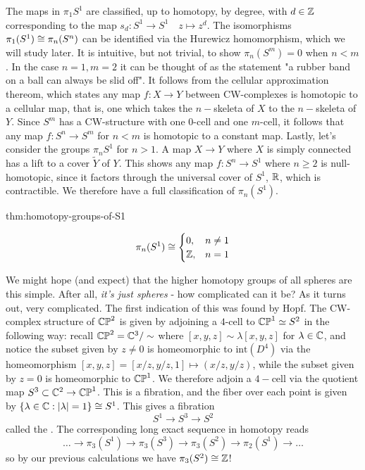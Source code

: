 The maps in $\pi_1S^1$ are classified, up to homotopy, by degree, with $d\in \mathbb{Z}$ corresponding to the map $s_d:S^1\rightarrow S^1 \quad z\mapsto z^d$. The isomorphisms $\pi_1(S^1)\cong \pi_n(S^n)$ can be identified via the Hurewicz homomorphism, which we will study later. It is intuitive, but not trivial, to show $\pi_n(S^m)=0$ when $n<m$. In the case $n=1,m=2$ it can be thought of as the statement "a rubber band on a ball can always be slid off". It follows from the cellular approximation thereom, which states any map $f:X\rightarrow Y$ between CW-complexes is homotopic to a cellular map, that is, one which takes the $n-$skeleta of $X$ to the $n-$skeleta of $Y$. Since $S^m$ has a CW-structure with one $0$-cell and one $m$-cell, it follows that any map $f:S^n\rightarrow S^m$ for $n<m$ is homotopic to a constant map. Lastly, let's consider the groups $\pi_n S^1$ for $n>1$. A map $X\rightarrow Y$ where $X$ is simply connected has a lift to a cover $\tilde{Y}$ of $Y$. This shows any map $f:S^n\rightarrow S^1$ where $n\geq 2$ is null-homotopic, since it factors through the universal cover of $S^1$, $\mathbb{R}$, which is contractible. We therefore have a full classification of $\pi_n(S^1).$

\begin{theorem}{thm:homotopy-groups-of-S1}

\[\pi_n(S^1)\cong\begin{cases}0, & n\neq 1\\ \mathbb{Z}, & n=1\end{cases}\]

\end{theorem}

We might hope (and expect) that the higher homotopy groups of all spheres are this simple. After all, \textit{it's just spheres} - how complicated can it be? As it turns out, very complicated. The first indication of this was found by Hopf. The CW-complex structure of $\mathbb{CP}^{2}$ is given by adjoining a $4$-cell to $\mathbb{CP}^{1} \simeq S^2$ in the following way: recall $\mathbb{CP}^{2}=\mathbb{C}^3/\sim$ where $[x,y,z]\sim \lambda [x,y,z]$ for $\lambda \in \mathbb{C}$, and notice the subset given by $z\neq 0$ is homeomorphic to $\text{int}(D^4)$ via the homeomorphism $[x,y,z]= [x/z,y/z,1]\mapsto (x/z,y/z)$, while the subset given by $z=0$ is homeomorphic to $\mathbb{CP}^{1}$. We therefore adjoin a $4-$cell via the quotient map $S^3\subset \mathbb{C}^2 \rightarrow \mathbb{CP}^{1}$. This is a fibration, and the fiber over each point is given by $\{\lambda\in \mathbb{C}:|\lambda|=1\}\cong S^1$. This gives a fibration
$$S^1\rightarrow S^3\rightarrow S^2$$
called the . The corresponding long exact sequence in homotopy reads
$$\dots\rightarrow \pi_3(S^1)\rightarrow \pi_3(S^3)\rightarrow \pi_3(S^2)\rightarrow \pi_2(S^1)\rightarrow \dots$$
so by our previous calculations we have $\pi_3(S^2)\cong \mathbb{Z}$! 

